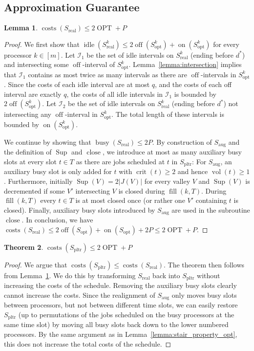 \documentclass[a4paper]{article}
\DeclareMathOperator{\on}{on}
\DeclareMathOperator{\off}{off}
\DeclareMathOperator{\idle}{idle}
\DeclareMathOperator{\busy}{busy}
\DeclareMathOperator{\costs}{costs}
\DeclareMathOperator{\OPT}{OPT}
\DeclareMathOperator{\opt}{opt}
\DeclareMathOperator{\pltr}{pltr}
\DeclareMathOperator{\aug}{aug}
\DeclareMathOperator{\real}{real}
\DeclareMathOperator{\vol}{vol}
\DeclareMathOperator{\crit}{crit}
\DeclareMathOperator{\fillop}{fill}
\DeclareMathOperator{\close}{close}
\DeclareMathOperator{\res}{Sup}
\newtheorem{theorem}{Theorem}
\newtheorem{lemma}[theorem]{Lemma}
\begin{document}
\subsection{Approximation Guarantee}
\todo[inline]{Define $\busy$-, $\idle$-, $\off$-, and $\on$-costs as in my thesis.}
\begin{lemma}\label{lemma:costs_s_real}
  $\costs(S_{\real}) \leq 2 \OPT + P$
\end{lemma}
\begin{proof}
  We first show that $\idle(S^k_{\real}) \leq 2 \off(S^k_{\opt}) + \on(S^k_{\opt})$ for every processor $k \in [m]$.
  Let $\mathcal{I}_1$ be the set of idle intervals on $S^k_{\real}$ (ending before $d^*$) and intersecting some $\off$-interval of $S^k_{\opt}$.
  Lemma~\ref{lemma:intersection} implies that $\mathcal{I}_1$ contains as most twice as many intervals as there are $\off$-intervals in $S^k_{\opt}$.
  Since the costs of each idle interval are at most $q$, and the costs of each off interval are exactly $q$, the costs of all idle intervals in $\mathcal{I}_1$ is bounded by $2 \off(S^k_{\opt})$.
  Let $\mathcal{I}_2$ be the set of idle intervals on $S^k_{\real}$ (ending before $d^*$) not intersecting any $\off$-interval in $S^k_{\opt}$.
  The total length of these intervals is bounded by $\on(S^k_{\opt})$.

  We continue by showing that $\busy(S_{\real}) \leq 2 P$.
  By construction of $S_{\aug}$ and the definition of $\res$ and $\close$, we introduce at most as many auxiliary busy slots at every slot $t \in T$ as there are jobs scheduled at $t$ in $S_{\pltr}$:
  For $S_{\aug}$, an auxiliary busy slot is only added for $t$ with $\crit(t) \geq 2$ and hence $\vol(t) \geq 1$.
  Furthermore, initially $\res(V) = 2 |J(V)|$ for every valley $V$ and $\res(V)$ is decremented if some $V'$ intersecting $V$ is closed during $\fillop(k, T)$.
  During $\fillop(k, T)$ every $t \in T$ is at most closed once (or rather one $V'$ containing $t$ is closed).
  Finally, auxiliary busy slots introduced by $S_{\aug}$ are used in the subroutine $\close$.
  In conclusion, we have $\costs(S_{\real}) \leq 2 \off(S_{\opt}) + \on(S_{\opt}) + 2 P \leq 2 \OPT + P$.
\end{proof}


\begin{theorem}
  $\costs(S_{\pltr}) \leq 2 \OPT + P$
\end{theorem}
\begin{proof}
  We argue that $\costs(S_{\pltr}) \leq \costs(S_{\real})$.
  The theorem then follows from Lemma~\ref{lemma:costs_s_real}.
  We do this by transforming $S_{\real}$ back into $S_{\pltr}$ without increasing the costs of the schedule.
  Removing the auxiliary busy slots clearly cannot increase the costs.
  Since the realignment of $S_{\aug}$ only moves busy slots between processors, but not between different time slots, we can easily restore $S_{\pltr}$ (up to permutations of the jobs scheduled on the busy processors at the same time slot) by moving all busy slots back down to the lower numbered processors.
  By the same argument as in Lemma~\ref{lemma:stair_property_opt}, this does not increase the total costs of the schedule.
\end{proof}
\end{document}
